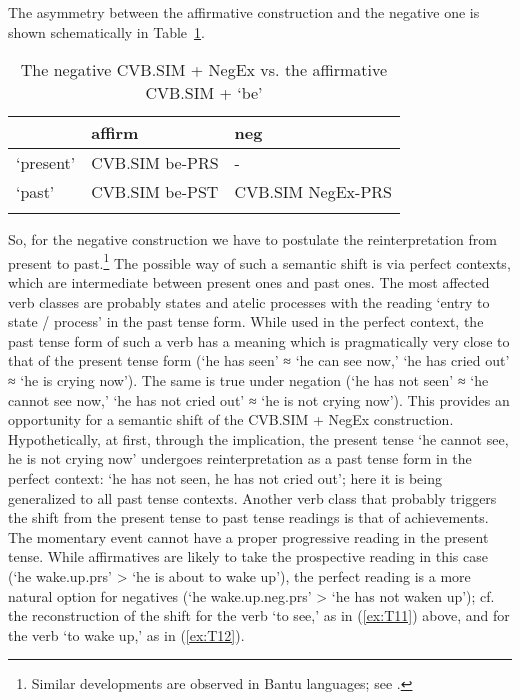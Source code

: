 \documentclass[output=paper]{langscibook}
\begin{document}
The asymmetry between the affirmative construction and the negative one is shown schematically in Table \ref{tab:T10}.

\begin{table}[!h]
    \caption{The negative CVB.SIM + NegEx vs. the affirmative CVB.SIM + ‘be’}
    \label{tab:T10}
    \begin{tabular}{@{}lll@{}}
    \lsptoprule
     & affirm & neg \\ \midrule
    ‘present’ & CVB.SIM be-PRS & -\footnotemark \\
    ‘past’ & CVB.SIM be-PST & CVB.SIM NegEx-PRS \\ \lspbottomrule
    \end{tabular}
    \end{table}


So, for the negative construction we have to postulate the reinterpretation from present to past.\footnote{Similar developments are observed in Bantu languages; see \citet[148]{Nurse2008}.} The possible way of such a semantic shift is via perfect contexts, which are intermediate between present ones and past ones. The most affected verb classes are probably states and atelic processes with the reading ‘entry to state / process’ in the past tense form. While used in the perfect context, the past tense form of such a verb has a meaning which is pragmatically very close to that of the present tense form (‘he has seen’ ≈ ‘he can see now,’ ‘he has cried out’ ≈ ‘he is crying now’). The same is true under negation (‘he has not seen’ ≈ ‘he cannot see now,’ ‘he has not cried out’ ≈ ‘he is not crying now’). This provides an opportunity for a semantic shift of the CVB.SIM + NegEx construction. Hypothetically, at first, through the implication, the present tense ‘he cannot see, he is not crying now’ undergoes reinterpretation as a past tense form in the perfect context: ‘he has not seen, he has not cried out’; here it is being generalized to all past tense contexts. Another verb class that probably triggers the shift from the present tense to past tense readings is that of achievements. The momentary event cannot have a proper progressive reading in the present tense. While affirmatives are likely to take the prospective reading in this case (‘he wake.up.prs’ > ‘he is about to wake up’), the perfect reading is a more natural option for negatives (‘he wake.up.neg.prs’ > ‘he has not waken up’); cf. the reconstruction of the shift for the verb ‘to see,’ as in (\ref{ex:T11}) above, and for the verb ‘to wake up,’ as in (\ref{ex:T12}).
\end{document}
